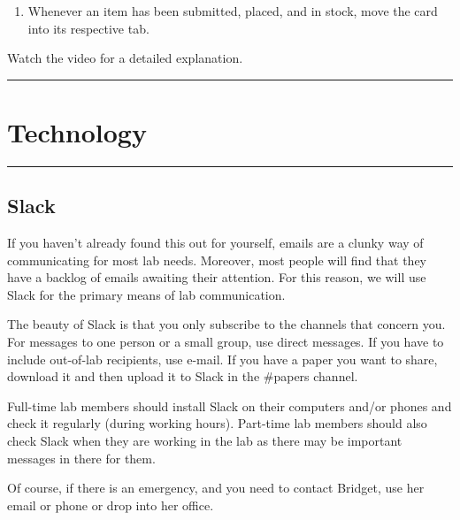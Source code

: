 \documentclass[]{book}
\providecommand{\tightlist}{%
  \setlength{\itemsep}{0pt}\setlength{\parskip}{0pt}}
\begin{document}
\begin{enumerate}
\def\labelenumi{\arabic{enumi}.}
\setcounter{enumi}{5}
\tightlist
\item
  Whenever an item has been submitted, placed, and in stock, move the card into its respective tab.
\end{enumerate}

Watch the video for a detailed explanation.

\begin{center}\rule{0.5\linewidth}{\linethickness}\end{center}

\hypertarget{technology}{%
\section{Technology}\label{technology}}

\begin{center}\rule{0.5\linewidth}{\linethickness}\end{center}

\hypertarget{slack}{%
\subsection{Slack}\label{slack}}

If you haven't already found this out for yourself, emails are a clunky way of communicating for most lab needs. Moreover, most people will find that they have a backlog of emails awaiting their attention. For this reason, we will use Slack for the primary means of lab communication.

The beauty of Slack is that you only subscribe to the channels that concern you. For messages to one person or a small group, use direct messages. If you have to include out-of-lab recipients, use e-mail. If you have a paper you want to share, download it and then upload it to Slack in the \#papers channel.

Full-time lab members should install Slack on their computers and/or phones and check it regularly (during working hours). Part-time lab members should also check Slack when they are working in the lab as there may be important messages in there for them.

Of course, if there is an emergency, and you need to contact Bridget, use her email or phone or drop into her office.
\end{document}
